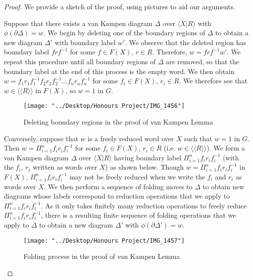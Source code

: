 \documentclass[12pt]{article}
\newcommand{\vs}{\vskip10pt}
\begin{document}
	\begin{proof}
		
		We provide a sketch of the proof, using pictures to aid our arguments. 
		
		\vs
		
		Suppose that there exists a van Kampen diagram $\Delta$ over $\langle X \vert R \rangle$ with $\phi(\partial \Delta) = w$. We begin by deleting one of the boundary regions of $\Delta$ to obtain a new diagram $\Delta'$ with boundary label $w'$. We observe that the deleted region has boundary label $frf^{-1}$ for some $f \in F(X)$, $r \in R$. Therefore, $w = frf^{-1} w'$. We repeat this procedure until all boundary regions of $\Delta$ are removed, so that the boundary label at the end of this process is the empty word. We then obtain $w = f_1 r_1 f_1^{-1} f_2 r_2 f_2^{-1}...f_n r_n f_n^{-1}$ for some $f_i \in F(X)$, $r_i \in R$. We therefore see that $w \in \langle \langle R \rangle \rangle$ in $F(X)$, so $w = 1$ in $G$. 
		
\begin{figure} [H]
	\centering
	\texttt{[image: "../Desktop/Honours Project/IMG\_1456"]}
	\caption{Deleting boundary regions in the proof of van Kampen Lemma}
	\label{fig:img1456}
\end{figure}
		
		\vs 
		
		Conversely, suppose that $w$ is a freely reduced word over $X$ such that $w = 1$ in $G$. Then $w = \Pi_{i=1}^n f_i r_i f_i^{-1}$ for some $f_i \in F(X)$, $r_i \in R$ (i.e. $w \in \langle \langle R \rangle \rangle$). We form a van Kampen diagram $\Delta$ over $\langle X \vert R \rangle$ having boundary label $\Pi_{i=1}^n f_i r_i f_i^{-1}$ (with the $f_i$, $r_i$ written as words over $X$) as shown below. Though $w = \Pi_{i=1}^n f_i r_i f_i^{-1}$ in $F(X)$, $\Pi_{i=1}^n f_i r_i f_i^{-1}$ may not be freely reduced when we write the $f_i$ and $r_i$ as words over $X$. We then perform a sequence of folding moves to $\Delta$ to obtain new diagrams whose labels correspond to reduction operations that we apply to $\Pi_{i=1}^n f_i r_i f_i^{-1}$. As it only takes finitely many reduction operations to freely reduce $\Pi_{i=1}^n f_i r_i f_i^{-1}$, there is a resulting finite sequence of folding operations that we apply to $\Delta$ to obtain a new diagram $\Delta'$ with $\phi(\partial \Delta') = w$. 
		
\begin{figure} [H]
	\centering
	\texttt{[image: "../Desktop/Honours Project/IMG\_1457"]}
	\caption{Folding process in the proof of van Kampen Lemma}
	\label{fig:img1457}
\end{figure}
		
	\end{proof}
	
\end{document}
